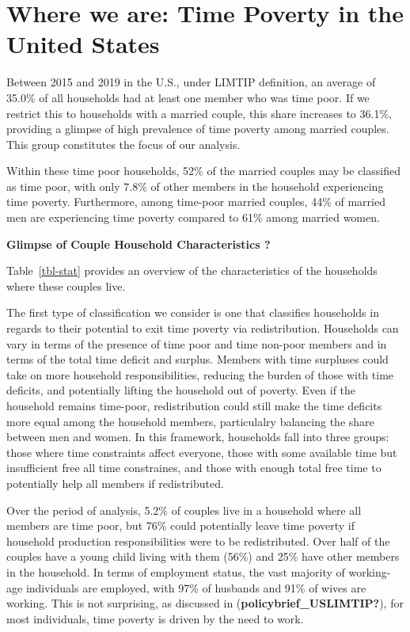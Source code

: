 \documentclass[
  11pt,
]{article}
\begin{document}
\section{Where we are: Time Poverty in the United
States}\label{where-we-are-time-poverty-in-the-united-states}

Between 2015 and 2019 in the U.S., under LIMTIP definition, an average
of 35.0\% of all households had at least one member who was time poor.
If we restrict this to households with a married couple, this share
increases to 36.1\%, providing a glimpse of high prevalence of time
poverty among married couples. This group constitutes the focus of our
analysis.

Within these time poor households, 52\% of the married couples may be
classified as time poor, with only 7.8\% of other members in the
household experiencing time poverty. Furthermore, among time-poor
married couples, 44\% of married men are experiencing time poverty
compared to 61\% among married women.

\textbf{Glimpse of Couple Household Characteristics ?}

Table~\ref{tbl-stat} provides an overview of the characteristics of the
households where these couples live.

The first type of classification we consider is one that classifies
households in regards to their potential to exit time poverty via
redistribution. Households can vary in terms of the presence of time
poor and time non-poor members and in terms of the total time deficit
and surplus. Members with time surpluses could take on more household
responsibilities, reducing the burden of those with time deficits, and
potentially lifting the household out of poverty. Even if the household
remains time-poor, redistribution could still make the time deficits
more equal among the household members, particulalry balancing the share
between men and women. In this framework, households fall into three
groups: those where time constraints affect everyone, those with some
available time but insufficient free all time constraines, and those
with enough total free time to potentially help all members if
redistributed.

Over the period of analysis, 5.2\% of couples live in a household where
all members are time poor, but 76\% could potentially leave time poverty
if household production responsibilities were to be redistributed. Over
half of the couples have a young child living with them (56\%) and 25\%
have other members in the household. In terms of employment status, the
vast majority of working-age individuals are employed, with 97\% of
husbands and 91\% of wives are working. This is not surprising, as
discussed in (\textbf{policybrief\_USLIMTIP?}), for most individuals,
time poverty is driven by the need to work.
\end{document}
